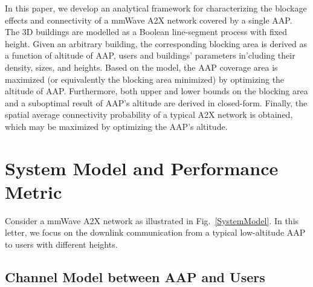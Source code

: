 \documentclass[12pt, draftclsnofoot, onecolumn]{IEEEtran}
\begin{document}
In this paper, we develop an analytical framework for characterizing the blockage effects and connectivity of a mmWave A2X network covered by a single AAP. The  3D buildings are modelled as a  Boolean line-segment process with fixed height. Given an arbitrary building, the corresponding blocking area is derived as a function of altitude of AAP, users and buildings' parameters in'cluding their density, sizes, and heights. Based on the model, the AAP coverage area is maximized (or equivalently  the blocking area minimized) by optimizing the altitude of AAP. Furthermore, both upper and lower bounds on the  blocking area and a suboptimal result of AAP's altitude are derived in closed-form. Finally, the spatial average connectivity probability of a typical A2X network is obtained, which may be maximized by optimizing the AAP's altitude.



\section{System Model and Performance Metric}
Consider a mmWave   A2X network as illustrated in Fig.~\ref{SystemModel}. In this letter, we focus on the downlink communication from a typical low-altitude AAP to users with different heights.

\subsection{Channel Model between AAP and Users}
\end{document}

